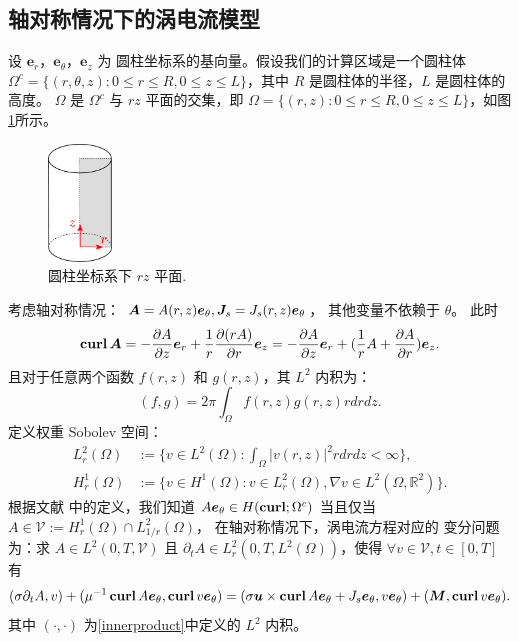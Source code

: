\subsection{轴对称情况下的涡电流模型}
设 $\boldsymbol{e}_r$，$\boldsymbol{e}_\theta$，$\boldsymbol{e}_z$ 为
圆柱坐标系的基向量。假设我们的计算区域是一个圆柱体 $\Omega^{c} 
= \{(r, \theta, z):
0\leq r\leq R, 0\leq z\leq L\}$，其中 $R$ 是圆柱体的半径，$L$ 是圆柱体的高度。
$\Omega$ 是 $\Omega^{c}$ 与 $rz$ 平面的交集，即 $\Omega = \{(r, z):
0\leq r\leq R, 0\leq z\leq L\}$，如图\ref{fig:rzplane}所示。
\begin{figure}[htpb]
  \centering
  \includegraphics[width=0.15\textwidth]{./figures/movingmaxwell/rzplane.pdf}
  \caption{圆柱坐标系下 $rz$ 平面.}
  \label{fig:rzplane}
\end{figure}
考虑轴对称情况：
$\boldsymbol{A} = A(r, z) \boldsymbol{e}_\theta, \boldsymbol{J}_s = J_s(r, z) \boldsymbol{e}_{\theta}$，
其他变量不依赖于 $\theta$。
此时
$$
\operatorname{\textbf{curl}} \boldsymbol{A} = -\frac{\partial A}{\partial z} \boldsymbol{e}_r + \frac{1}{r}
\frac{\partial (rA)}{\partial r} \boldsymbol{e}_z = - \frac{\partial A}{\partial
z} \boldsymbol{e}_r + (\frac{1}{r}A + \frac{\partial A}{\partial r}) \boldsymbol{e}_z.
$$
且对于任意两个函数 $f(r, z)$ 和 $g(r, z)$，其 $L^2$ 内积为：
\begin{equation}
\label{innerproduct}    
(f, g) = 2\pi\int_{\Omega} f(r, z) g(r, z) r dr dz.
\end{equation}
定义权重 Sobolev 空间：
$$
\begin{aligned}
L^2_r(\Omega) & := \{v \in L^2(\Omega): \int_{\Omega} |v(r, z)|^2 r dr dz <
\infty\},\\
H^1_r(\Omega) & := \{v \in H^1(\Omega): v \in L^2_r(\Omega), \nabla v \in 
L^2(\Omega, \mathbb{R}^2)\}.
\end{aligned}
$$
根据文献 \cite{Bermudez2013} 中的定义，我们知道 $A\boldsymbol{e}_\theta \in H(\operatorname{\textbf{curl}};
\Omega^c)$ 当且仅当 $A \in \mathcal{V} := H^1_r(\Omega)\cap L^2_{1/r}(\Omega)$，
在轴对称情况下，涡电流方程对应的
变分问题为：求 $A \in L^2(0, T, \mathcal{V})$ 且 $\partial_t A \in L^2_r(0, T,
L^2(\Omega))$，使得
$\forall v \in \mathcal{V}, t \in [0, T]$ 有
$$
(\sigma\partial_t A, v) +
(\mu^{-1}\operatorname{\textbf{curl}} A\boldsymbol{e}_{\theta}, \operatorname{\textbf{curl}} v\boldsymbol{e}_{\theta}) =
(\sigma\boldsymbol{u}\times \operatorname{\textbf{curl}} A\boldsymbol{e}_{\theta} + J_s\boldsymbol{e}_{\theta}, v\boldsymbol{e}_{\theta}) 
+ (\boldsymbol{M}, \operatorname{\textbf{curl}} v\boldsymbol{e}_{\theta}).
$$
其中 $(\cdot, \cdot)$ 为\eqref{innerproduct}中定义的
$L^2$ 内积。
